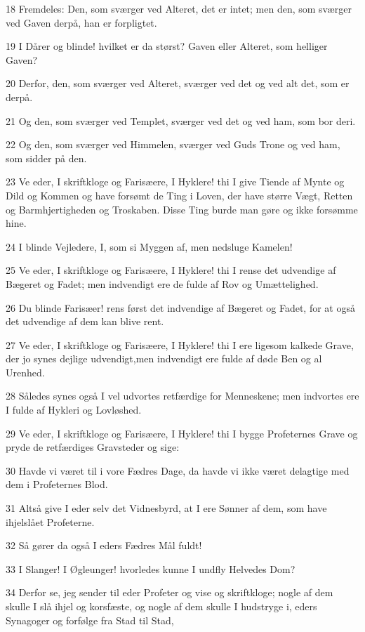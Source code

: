 \par 18 Fremdeles: Den, som sværger ved Alteret, det er intet; men den, som sværger ved Gaven derpå, han er forpligtet.
\par 19 I Dårer og blinde! hvilket er da størst? Gaven eller Alteret, som helliger Gaven?
\par 20 Derfor, den, som sværger ved Alteret, sværger ved det og ved alt det, som er derpå.
\par 21 Og den, som sværger ved Templet, sværger ved det og ved ham, som bor deri.
\par 22 Og den, som sværger ved Himmelen, sværger ved Guds Trone og ved ham, som sidder på den.
\par 23 Ve eder, I skriftkloge og Farisæere, I Hyklere! thi I give Tiende af Mynte og Dild og Kommen og have forsømt de Ting i Loven, der have større Vægt, Retten og Barmhjertigheden og Troskaben. Disse Ting burde man gøre og ikke forsømme hine.
\par 24 I blinde Vejledere, I, som si Myggen af, men nedsluge Kamelen!
\par 25 Ve eder, I skriftkloge og Farisæere, I Hyklere! thi I rense det udvendige af Bægeret og Fadet; men indvendigt ere de fulde af Rov og Umættelighed.
\par 26 Du blinde Farisæer! rens først det indvendige af Bægeret og Fadet, for at også det udvendige af dem kan blive rent.
\par 27 Ve eder, I skriftkloge og Farisæere, I Hyklere! thi I ere ligesom kalkede Grave, der jo synes dejlige udvendigt,men indvendigt ere fulde af døde Ben og al Urenhed.
\par 28 Således synes også I vel udvortes retfærdige for Menneskene; men indvortes ere I fulde af Hykleri og Lovløshed.
\par 29 Ve eder, I skriftkloge og Farisæere, I Hyklere! thi I bygge Profeternes Grave og pryde de retfærdiges Gravsteder og sige:
\par 30 Havde vi været til i vore Fædres Dage, da havde vi ikke været delagtige med dem i Profeternes Blod.
\par 31 Altså give I eder selv det Vidnesbyrd, at I ere Sønner af dem, som have ihjelslået Profeterne.
\par 32 Så gører da også I eders Fædres Mål fuldt!
\par 33 I Slanger! I Øgleunger! hvorledes kunne I undfly Helvedes Dom?
\par 34 Derfor se, jeg sender til eder Profeter og vise og skriftkloge; nogle af dem skulle I slå ihjel og korsfæste, og nogle af dem skulle I hudstryge i, eders Synagoger og forfølge fra Stad til Stad,
